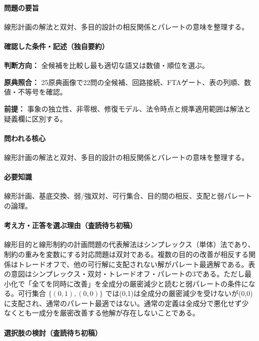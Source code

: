 \paragraph{問題の要旨} 線形計画の解法と双対、多目的設計の相反関係とパレートの意味を整理する。

\paragraph{確認した条件・記述（独自要約）}\mbox{}\par

\noindent\textbf{判断方向：} 全候補を比較し最も適切な語又は数値・順位を選ぶ。\par

\noindent\textbf{原典照合：} 25原典画像で22問の全候補、回路接続、FTAゲート、表の列順、数値・不等号を確認。\par

\noindent\textbf{前提：} 事象の独立性、非零根、修復モデル、法令時点と規準適用範囲は解法と疑義欄に区別する。\par

\paragraph{問われる核心} 線形計画の解法と双対、多目的設計の相反関係とパレートの意味を整理する。

\paragraph{必要知識} 線形計画、基底交換、弱/強双対、可行集合、目的間の相反、支配と弱パレートの論理。

\paragraph{考え方・正答を選ぶ理由（査読待ち初稿）} 線形目的と線形制約の計画問題の代表解法はシンプレックス（単体）法であり、制約の重みを変数にする対応問題は双対である。複数の目的の改善が相反する関係はトレードオフで、他の可行解に支配されない解がパレート最適解である。表の意図はシンプレックス・双対・トレードオフ・パレートの3である。ただし最小化で「全てを同時に改善」を全成分の厳密減少と読むと弱パレートの条件になる。可行集合 \(\{(0,1),(0,0)\}\) では(0,1)は全成分の厳密減少を受けないが(0,0)に支配され、通常のパレート最適ではない。通常の定義は全成分で悪化せず少なくとも一成分を厳密改善する他解が存在しないことである。

\paragraph{選択肢の検討（査読待ち初稿）}\mbox{}\par

